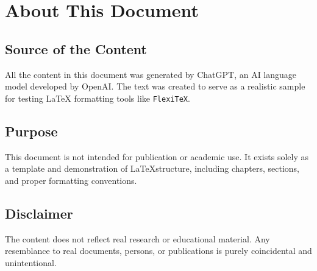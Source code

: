 \chapter{About This Document}

\section{Source of the Content}
All the content in this document was generated by ChatGPT, an AI language model developed by OpenAI. The text was created to serve as a realistic sample for testing LaTeX formatting tools like \texttt{Flexi\TeX}.

\section{Purpose}
This document is not intended for publication or academic use. It exists solely as a template and demonstration of \LaTeX structure, including chapters, sections, and proper formatting conventions.

\section{Disclaimer}
The content does not reflect real research or educational material. Any resemblance to real documents, persons, or publications is purely coincidental and unintentional.

